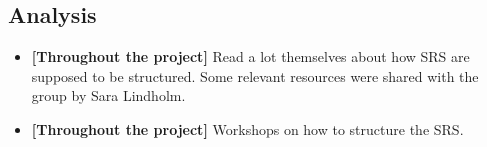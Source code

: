 \documentclass[12pt]{article}
\begin{document}
\subsection{Analysis}
\begin{itemize}
    \item \textbf{[Throughout the project]} Read a lot themselves about how SRS are supposed to be structured. Some relevant resources were shared with the group by Sara Lindholm. 
    \item \textbf{[Throughout the project]} Workshops on how to structure the SRS. 
\end{itemize}
\end{document}
